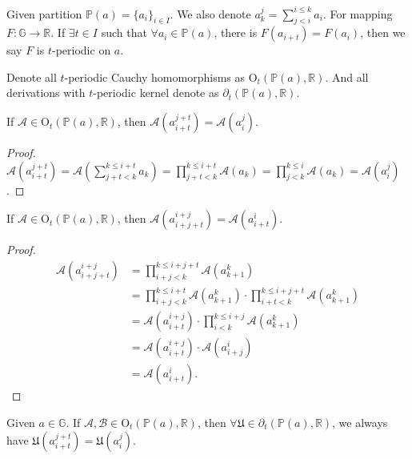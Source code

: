 \begin{definition}
Given partition $\mathbb{P}(a) = \{a_i\}_{i\in I}$. We also denote $a_{k}^{j} = \sum_{j < i}^{i \le k}a_i$.
For mapping $F:\mathbb{G} \to \mathbb{R}$.
If $\exists t\in I$ such that $\forall a_i\in \mathbb{P}(a)$, there is $F(a_{i+t}) = F(a_i)$, then we say $F$ is $t$-periodic on $a$.
\end{definition}
\begin{definition}
    Denote all $t$-periodic Cauchy homomorphisms as $\mathrm{O}_{t}(\mathbb{P}(a),\mathbb{R})$.
    And all derivations with $t$-periodic kernel denote as $\partial_{t}(\mathbb{P}(a),\mathbb{R})$.
\end{definition}
\begin{proposition}
    If $\mathcal{A} \in \mathrm{O}_{t}(\mathbb{P}(a), \mathbb{R})$, then $\mathcal{A}(a_{i+t}^{j+t}) = \mathcal{A}(a_{i}^{j})$.
\end{proposition}
\begin{proof}
    $\mathcal{A}(a_{i+t}^{j+t}) = \mathcal{A}(\sum_{j+t < k}^{k \le i+t}a_k) = \prod_{j+t < k}^{k \le i+t}\mathcal{A}(a_k) = \prod_{j < k}^{k \le i}\mathcal{A}(a_{k}) = \mathcal{A}(a_{i}^{j})$.
\end{proof}
\begin{proposition}
    If $\mathcal{A} \in \mathrm{O}_{t}(\mathbb{P}(a), \mathbb{R})$, then $\mathcal{A}(a_{i+j+t}^{i+j}) = \mathcal{A}(a_{i+t}^{i})$.
\end{proposition}
\begin{proof}
    \begin{align*}
        \mathcal{A}(a_{i+j+t}^{i+j}) &= \prod_{i+j < k}^{k\le i+j+t}\mathcal{A}(a_{k+1}^{k}) \\
        &= \prod_{i+j < k}^{k\le i+t}\mathcal{A}(a_{k+1}^{k}) \cdot \prod_{i+t < k}^{k\le i+j+t}\mathcal{A}(a_{k+1}^{k}) \\
        &= \mathcal{A}(a_{i+t}^{i+j}) \cdot \prod_{i < k}^{k\le i+j}\mathcal{A}(a_{k+1}^{k}) \\
        &= \mathcal{A}(a_{i+t}^{i+j})\cdot \mathcal{A}(a_{i+j}^{i}) \\
        &= \mathcal{A}(a_{i+t}^{i}).
    \end{align*}
\end{proof}
\begin{proposition}\label{prop:cycles-derive-cycle}
    Given $a\in\mathbb{G}$. If $\mathcal{A}, \mathcal{B} \in \mathrm{O}_{t}(\mathbb{P}(a), \mathbb{R})$, then $\forall \mathfrak{U} \in \partial_{t}(\mathbb{P}(a), \mathbb{R})$, we always have $\mathfrak{U}(a_{i+t}^{j+t}) = \mathfrak{U}(a_{i}^{j})$.
\end{proposition}
